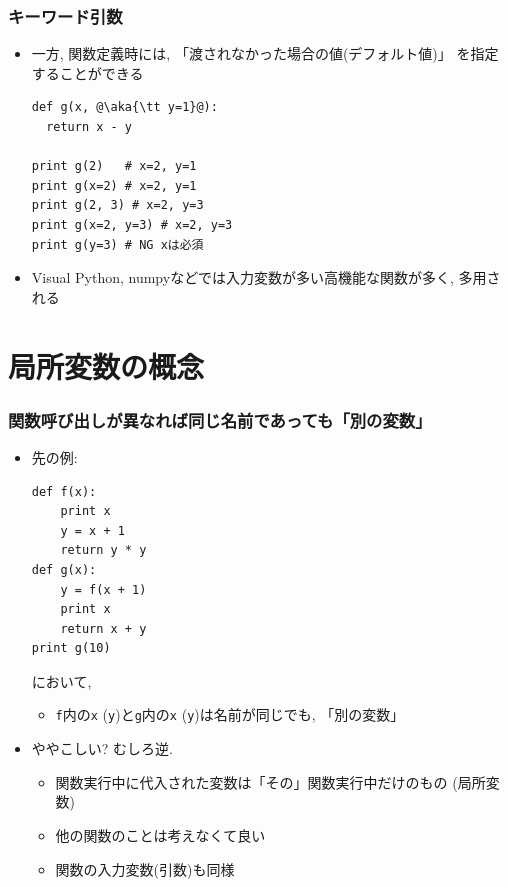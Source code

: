 \documentclass[10pt,dvipdfmx]{beamer}
\newcommand{\aka}[1]{{\color{red}#1}}
\begin{document}
\begin{frame}[fragile]
\frametitle{キーワード引数}
\begin{itemize}
\item 一方, 関数定義時には,
\aka{「渡されなかった場合の値(デフォルト値)」}
を指定することができる
\begin{lstlisting}
def g(x, @\aka{\tt y=1}@):
  return x - y

print g(2)   # x=2, y=1
print g(x=2) # x=2, y=1
print g(2, 3) # x=2, y=3
print g(x=2, y=3) # x=2, y=3
print g(y=3) # NG xは必須
\end{lstlisting}

\item Visual Python, numpyなどでは入力変数が多い高機能な関数が多く,
\aka{多用される}
  
\end{itemize}
\end{frame}

\section{局所変数の概念}

\begin{frame}[fragile]
\frametitle{関数呼び出しが異なれば同じ名前であっても「別の変数」}
\begin{itemize}
\item 先の例:
\begin{lstlisting}
def f(x):
    print x
    y = x + 1
    return y * y
def g(x):
    y = f(x + 1)
    print x
    return x + y
print g(10)
\end{lstlisting}
において, 
\begin{itemize}
\item {\tt f}内の{\tt x} ({\tt y})と{\tt g}内の{\tt x}
  ({\tt y})は名前が同じでも, 「別の変数」
\end{itemize}

\item ややこしい? むしろ逆.
  \begin{itemize}
  \item 関数実行中に代入された変数は「その」関数実行中だけのもの
    \aka{(局所変数)}
  \item 他の関数のことは考えなくて良い
  \item 関数の入力変数(引数)も同様
  \end{itemize}
\end{itemize}
\end{frame}
\end{document}
